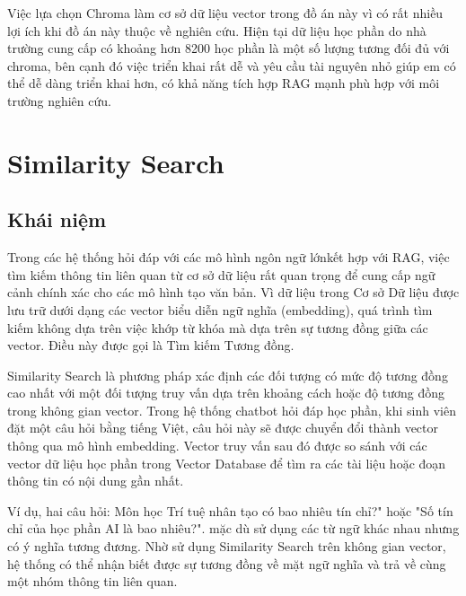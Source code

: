 \documentclass[../DoAn.tex]{subfiles}
\begin{document}
Việc lựa chọn Chroma làm cơ sở dữ liệu vector trong đồ án này vì có rất nhiều lợi ích khi đồ án này thuộc về nghiên cứu. Hiện tại dữ liệu học phần do nhà trường cung cấp có khoảng hơn 8200 học phần là một số lượng tương đối đủ với chroma, bên cạnh đó việc triển khai rất dễ và yêu cầu tài nguyên nhỏ giúp em có thể dễ dàng triển khai hơn, có khả năng tích hợp RAG mạnh phù hợp với môi trường nghiên cứu.

\section{Similarity Search}
\subsection{Khái niệm}
Trong các hệ thống hỏi đáp với các mô hình ngôn ngữ lớnkết hợp với  RAG, việc tìm kiếm thông tin liên quan từ cơ sở dữ liệu rất quan trọng để cung cấp ngữ cảnh chính xác cho các mô hình tạo văn bản. Vì dữ liệu trong Cơ sở Dữ liệu được lưu trữ dưới dạng các vector biểu diễn ngữ nghĩa (embedding), quá trình tìm kiếm không dựa trên việc khớp từ khóa mà dựa trên sự tương đồng giữa các vector. Điều này được gọi là Tìm kiếm Tương đồng.

Similarity Search là phương pháp xác định các đối tượng có mức độ tương đồng cao nhất với một đối tượng truy vấn dựa trên khoảng cách hoặc độ tương đồng trong không gian vector. Trong hệ thống chatbot hỏi đáp học phần, khi sinh viên đặt một câu hỏi bằng tiếng Việt, câu hỏi này sẽ được chuyển đổi thành vector thông qua mô hình embedding. Vector truy vấn sau đó được so sánh với các vector dữ liệu học phần trong Vector Database để tìm ra các tài liệu hoặc đoạn thông tin có nội dung gần nhất.

Ví dụ, hai câu hỏi: Môn học Trí tuệ nhân tạo có bao nhiêu tín chỉ?" hoặc "Số tín chỉ của học phần AI là bao nhiêu?". mặc dù sử dụng các từ ngữ khác nhau nhưng có ý nghĩa tương đương. Nhờ sử dụng Similarity Search trên không gian vector, hệ thống có thể nhận biết được sự tương đồng về mặt ngữ nghĩa và trả về cùng một nhóm thông tin liên quan.
\end{document}
